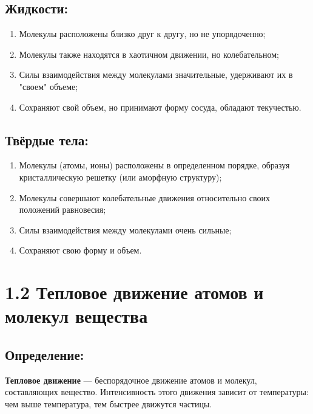 \documentclass[a4paper,12pt]{article}
\begin{document}
\subsection*{Жидкости:}
\vspace{-3pt}
\begin{enumerate}[itemsep=0pt, topsep=0pt, parsep=0pt]
  \item Молекулы расположены близко друг к другу, но не упорядоченно;
  \item Молекулы также находятся в хаотичном движении, но колебательном;
  \item Силы взаимодействия между молекулами значительные, удерживают их в "своем" объеме; 
  \item Сохраняют свой объем, но принимают форму сосуда, обладают текучестью.
\end{enumerate}

\vspace{-9pt}
\subsection*{Твёрдые тела:}
\vspace{-3pt}
\begin{enumerate} [itemsep=0pt, topsep=0pt, parsep=0pt]
  \item Молекулы (атомы, ионы) расположены в определенном порядке, образуя кристаллическую решетку (или аморфную структуру);
   \item Молекулы совершают колебательные движения относительно своих положений равновесия;
    \item Силы взаимодействия между молекулами очень сильные; 
  \item Сохраняют свою форму и объем.
\end{enumerate}


\section*{1.2 Тепловое движение атомов и молекул вещества}

\vspace{-9pt}
\subsection*{Определение:}
\vspace{-3pt}
\textbf{Тепловое движение} --- беспорядочное движение атомов и молекул, составляющих вещество. Интенсивность этого движения зависит от температуры: чем выше температура, тем быстрее движутся частицы.
\end{document}
